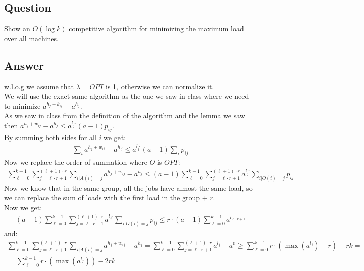 \subsection{Question}
Show an $O(\log k)$ competitive algorithm for minimizing the maximum load over all machines.\\

\subsection{Answer}
w.l.o.g we assume that $\lambda = OPT$ is 1, otherwise we can normalize it.\\
We will use the exact same algorithm as the one we saw in class where we need to minimize $a^{h_{j}+k_{ij}} - a^{h_{j}}$.\\
As we saw in class from the definition of the algorithm and the lemma we saw then $a^{h_{j}+w_{ij}} - a^{h_{j}} \leq a^{l_{j^{*}}}(a-1)p_{ij}$.\\
By summing both sides for all $i$ we get:
\begin{gather*}
    \sum_{i} a^{h_{j}+w_{ij}} - a^{h_{j}} \leq a^{l_{j^{*}}}(a-1)\sum_{i} p_{ij}
\end{gather*}
Now we replace the order of summation where $O$ is $OPT$:
\begin{gather*}
    \sum_{\ell=0}^{k-1} \sum_{j=\ell\cdot r + 1}^{(\ell+1)\cdot r} \sum_{i|A(i)=j} a^{h_{j}+w_{ij}} - a^{h_{j}} \leq 
    (a-1) \sum_{\ell=0}^{k-1} \sum_{j=\ell\cdot r + 1}^{(\ell+1)\cdot r} a^{l_{j^{*}}} \sum_{i|O(i)=j} p_{ij}
\end{gather*}
Now we know that in the same group, all the jobs have almost the same load, so we can replace the sum of loads with the first load in the group + $r$.\\
Now we get:\\
\begin{gather*}
    (a-1) \sum_{\ell=0}^{k-1} \sum_{j=\ell\cdot r + 1}^{(\ell+1)\cdot r} a^{l_{j^{*}}} \sum_{i|O(i)=j} p_{ij} \leq 
    r\cdot(a-1) \sum_{\ell=0}^{k-1} a^{l_{\ell\cdot r + 1}}
\end{gather*}
and:
\begin{gather*}
    \sum_{\ell=0}^{k-1} \sum_{j=\ell\cdot r + 1}^{(\ell+1)\cdot r} \sum_{i|A(i)=j} a^{h_{j}+w_{ij}} - a^{h_{j}} =
    \sum_{\ell=0}^{k-1} \sum_{j=\ell\cdot r + 1}^{(\ell+1)\cdot r} a^{l_j} - a^{0} \geq 
    \sum_{\ell=0}^{k-1} r\cdot(\max(a^{l_{j}}) - r) - rk = \\ =
    \sum_{\ell=0}^{k-1} r\cdot(\max(a^{l_{j}})) - 2rk
\end{gather*}
